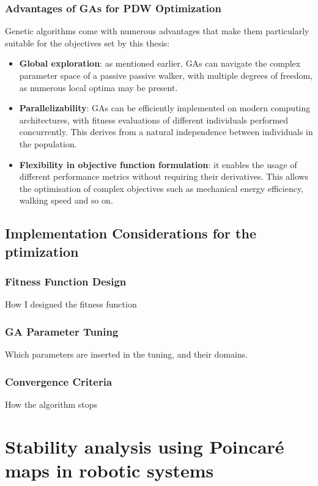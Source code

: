 \subsection{Advantages of GAs for PDW Optimization}
Genetic algorithms come with numerous advantages that make them particularly suitable for the objectives set by this thesis:

\begin{itemize}
    \item \textbf{Global exploration}: as mentioned earlier, GAs can navigate the complex parameter space of a passive passive walker, with multiple degrees of freedom, as numerous local optima may be present.
    \item \textbf{Parallelizability}: GAs can be efficiently implemented on modern computing architectures, with fitness evaluations of different individuals performed concurrently.
    This derives from a natural independence between individuals in the population.
    \item \textbf{Flexibility in objective function formulation}: it enables the usage of different performance metrics without requiring their derivatives. This allows the optimisation of complex objectives such as mechanical energy efficiency, walking speed and so on.
\end{itemize}


\section{Implementation Considerations for the ptimization}
\subsection{Fitness Function Design}
How I designed the fitness function

\subsection{GA Parameter Tuning}
Which parameters are inserted in the tuning, and their domains.

\subsection{Convergence Criteria}
How the algorithm stops 






\chapter{Stability analysis using Poincaré maps in robotic systems}
